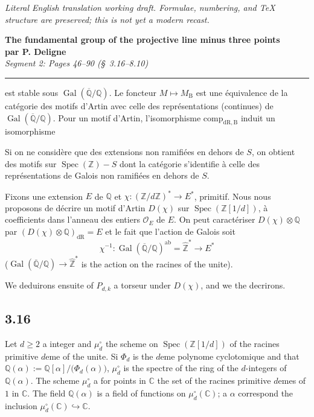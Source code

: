 \documentclass[12pt,a4paper]{article}
\theoremstyle{plain}
\theoremstyle{definition}
\theoremstyle{remark}
\DeclareMathOperator{\Spec}{Spec}
\DeclareMathOperator{\Gal}{Gal}
\newcommand{\DR}{\mathrm{dR}}
\newcommand{\B}{\mathrm{B}}
\newcommand{\OO}{\mathcal{O}}
\newcommand{\Z}{\mathbb{Z}}
\newcommand{\Q}{\mathbb{Q}}
\newcommand{\C}{\mathbb{C}}
\begin{document}
\begin{center}\small\emph{Literal English translation working draft. Formulae, numbering, and TeX structure are preserved; this is not yet a modern recast.}\end{center}
\vspace{0.5em}


\begin{center}
\Large\textbf{The fundamental group of the projective line minus three points}\\[0.5em]
\large\textbf{par P. Deligne}\\[1em]
\normalsize\textit{Segment 2: Pages 46--90 (\S\ 3.16--8.10)}
\end{center}

\vspace{1em}
\hrule
\vspace{1em}

\setcounter{section}{3}

est stable sous $\Gal(\overline{\Q}/\Q)$. Le foncteur $M \mapsto M_{\B}$ est une \'equivalence de la cat\'egorie des motifs d'Artin avec celle des repr\'esentations (continues) de $\Gal(\overline{\Q}/\Q)$. Pour un motif d'Artin, l'isomorphisme $\mathrm{comp}_{\DR,\B}$ induit un isomorphisme

Si on ne consid\`ere que des extensions non ramifi\'ees en dehors de $S$, on obtient des motifs sur $\Spec(\Z) - S$ dont la cat\'egorie s'identifie \`a celle des repr\'esentations de Galois non ramifi\'ees en dehors de $S$.

Fixons une extension $E$ de $\Q$ et $\chi: (\Z/d\Z)^* \to E^*$, primitif. Nous nous proposons de d\'ecrire un motif d'Artin $D(\chi)$ sur $\Spec(\Z[1/d])$, \`a coefficients dans l'anneau des entiers $\OO_E$ de $E$. On peut caract\'eriser $D(\chi) \otimes \Q$ par $(D(\chi) \otimes \Q)_{\DR} = E$ et le fait que l'action de Galois soit
\[
\chi^{-1}: \Gal(\overline{\Q}/\Q)^{\mathrm{ab}} = \hat{\Z}^* \longrightarrow E^*
\]
($\Gal(\overline{\Q}/\Q) \to \hat{\Z}^*$ is the action on the racines of the unite).

We deduirons ensuite of $P_{d,k}$ a torseur under $D(\chi)$, and we the decrirons.

\subsection*{3.16}

Let $d \geq 2$ a integer and $\mu_d^\circ$ the scheme on $\Spec(\Z[1/d])$ of the racines primitive $d$eme of the unite. Si $\Phi_d$ is the $d$eme polynome cyclotomique and that $\Q(\alpha) := \Q[\alpha]/\bigl(\Phi_d(\alpha)\bigr)$, $\mu_d^\circ$ is the spectre of the ring of the $d$-integers of $\Q(\alpha)$. The scheme $\mu_d^\circ$ a for points in $\C$ the set of the racines primitive $d$emes of $1$ in $\C$. The field $\Q(\alpha)$ is a field of functions on $\mu_d^\circ(\C)$; a $\alpha$ correspond the inclusion $\mu_d^\circ(\C) \hookrightarrow \C$.
\end{document}
